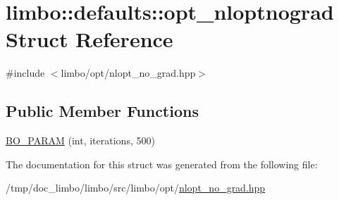 \hypertarget{structlimbo_1_1defaults_1_1opt__nloptnograd}{}\section{limbo\+:\+:defaults\+:\+:opt\+\_\+nloptnograd Struct Reference}
\label{structlimbo_1_1defaults_1_1opt__nloptnograd}


{\ttfamily \#include $<$limbo/opt/nlopt\+\_\+no\+\_\+grad.\+hpp$>$}

\subsection*{Public Member Functions}
\begin{DoxyCompactItemize}
\item 
\hyperlink{group__opt__defaults_gae76755c949c322e0a8a33806c811b6f2}{B\+O\+\_\+\+P\+A\+R\+A\+M} (int, iterations, 500)
\end{DoxyCompactItemize}


The documentation for this struct was generated from the following file\+:\begin{DoxyCompactItemize}
\item 
/tmp/doc\+\_\+limbo/limbo/src/limbo/opt/\hyperlink{nlopt__no__grad_8hpp}{nlopt\+\_\+no\+\_\+grad.\+hpp}\end{DoxyCompactItemize}
